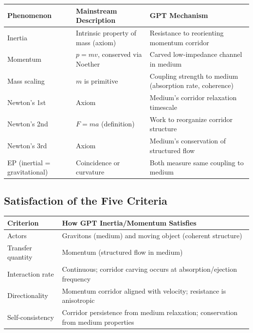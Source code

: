 \documentclass[12pt, a4paper]{article}
\begin{document}
\begin{center}
\begin{tabular}{|p{3.5cm}|p{5cm}|p{5cm}|}
\hline
\textbf{Phenomenon} & \textbf{Mainstream Description} & \textbf{GPT Mechanism} \\
\hline
Inertia & Intrinsic property of mass (axiom) & Resistance to reorienting momentum corridor \\
\hline
Momentum & \( p = mv \), conserved via Noether & Carved low-impedance channel in medium \\
\hline
Mass scaling & \( m \) is primitive & Coupling strength to medium (absorption rate, coherence) \\
\hline
Newton's 1st & Axiom & Medium's corridor relaxation timescale \\
\hline
Newton's 2nd & \( F = ma \) (definition) & Work to reorganize corridor structure \\
\hline
Newton's 3rd & Axiom & Medium's conservation of structured flow \\
\hline
EP (inertial = gravitational) & Coincidence or curvature & Both measure same coupling to medium \\
\hline
\end{tabular}
\end{center}

\subsection{Satisfaction of the Five Criteria}
\label{subsec:inertia_criteria}

\begin{center}
\begin{tabular}{|p{3.5cm}|p{10cm}|}
\hline
\textbf{Criterion} & \textbf{How GPT Inertia/Momentum Satisfies} \\
\hline
Actors & Gravitons (medium) and moving object (coherent structure) \\
\hline
Transfer quantity & Momentum (structured flow in medium) \\
\hline
Interaction rate & Continuous; corridor carving occurs at absorption/ejection frequency \\
\hline
Directionality & Momentum corridor aligned with velocity; resistance is anisotropic \\
\hline
Self-consistency & Corridor persistence from medium relaxation; conservation from medium properties \\
\hline
\end{tabular}
\end{center}
\end{document}
